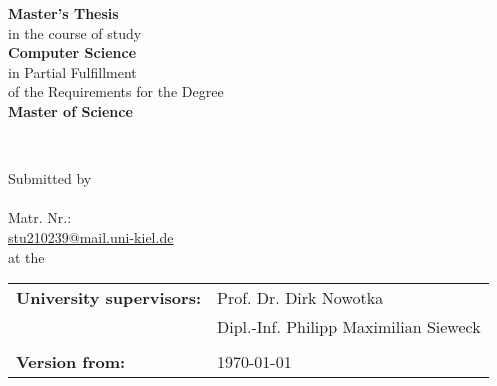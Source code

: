 
\begin{titlepage}

    
    
    
    
    \center
    \LARGE
    \vspace*{0.5cm}
    \textbf{Master's Thesis}\\[0.5cm]
    \large
    in the course of study\\
    \textbf{Computer Science}\\
    \vspace*{0.5cm}
    in Partial Fulfillment\\
    of the Requirements for the Degree\\
    \textbf{Master of Science}\\
    \vfill
    
    
    
    \begin{spacing}{2}
        {\huge \bfseries \textbf{\myThesis{}}}\\
    \end{spacing}
    \vfill
    
    
    
    
    Submitted by\\[0.5cm]
    
    \textbf{\myName{}}\\
    Matr. Nr.: \myStudentID{} \\
    \href{mailto:stu210239@mail.uni-kiel.de}{stu210239@mail.uni-kiel.de}\\[0.5cm]
    
    at the \myHochschule{} \\
    
    \vfill
    
    \begin{tabular}{ll}
        \textbf{University supervisors:} & Prof. Dr. Dirk Nowotka                \\
                                         & Dipl.-Inf. Philipp Maximilian Sieweck \\
                                         &                                       \\
        \textbf{Version from: }          & \today                                \\
    \end{tabular}
    
    \vfill
    
\end{titlepage}